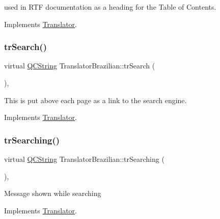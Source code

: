 used in R\+TF documentation as a heading for the Table of Contents. 

Implements \mbox{\hyperlink{class_translator}{Translator}}.

\mbox{\label{class_translator_brazilian_ac88cfeed78415f9b403e3f0b7b9ee116}} 
\subsubsection{\texorpdfstring{trSearch()}{trSearch()}}
{\footnotesize\ttfamily virtual \mbox{\hyperlink{class_q_c_string}{Q\+C\+String}} Translator\+Brazilian\+::tr\+Search (\begin{DoxyParamCaption}{ }\end{DoxyParamCaption})\hspace{0.3cm}{\ttfamily [inline]}, {\ttfamily [virtual]}}

This is put above each page as a link to the search engine. 

Implements \mbox{\hyperlink{class_translator}{Translator}}.

\mbox{\label{class_translator_brazilian_a1fb991e9ff658c0bc8d32905f870ddf9}} 
\subsubsection{\texorpdfstring{trSearching()}{trSearching()}}
{\footnotesize\ttfamily virtual \mbox{\hyperlink{class_q_c_string}{Q\+C\+String}} Translator\+Brazilian\+::tr\+Searching (\begin{DoxyParamCaption}{ }\end{DoxyParamCaption})\hspace{0.3cm}{\ttfamily [inline]}, {\ttfamily [virtual]}}

Message shown while searching 

Implements \mbox{\hyperlink{class_translator}{Translator}}.

\mbox{\label{class_translator_brazilian_a2eca46f17b9fc8de604a14a5bef694fc}} 
